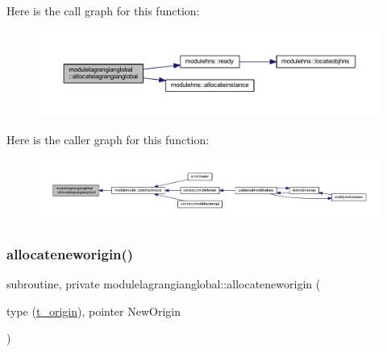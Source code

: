 Here is the call graph for this function\+:\nopagebreak
\begin{figure}[H]
\begin{center}
\leavevmode
\includegraphics[width=350pt]{namespacemodulelagrangianglobal_a8ae3b3566ebe3cc057810473a03a4abf_cgraph}
\end{center}
\end{figure}
Here is the caller graph for this function\+:\nopagebreak
\begin{figure}[H]
\begin{center}
\leavevmode
\includegraphics[width=350pt]{namespacemodulelagrangianglobal_a8ae3b3566ebe3cc057810473a03a4abf_icgraph}
\end{center}
\end{figure}
\mbox{\label{namespacemodulelagrangianglobal_a537c7269309c583343ae41dfe244a2b0}} 
\subsubsection{\texorpdfstring{allocateneworigin()}{allocateneworigin()}}
{\footnotesize\ttfamily subroutine, private modulelagrangianglobal\+::allocateneworigin (\begin{DoxyParamCaption}\item[{type (\mbox{\hyperlink{structmodulelagrangianglobal_1_1t__origin}{t\+\_\+origin}}), pointer}]{New\+Origin }\end{DoxyParamCaption})\hspace{0.3cm}{\ttfamily [private]}}

